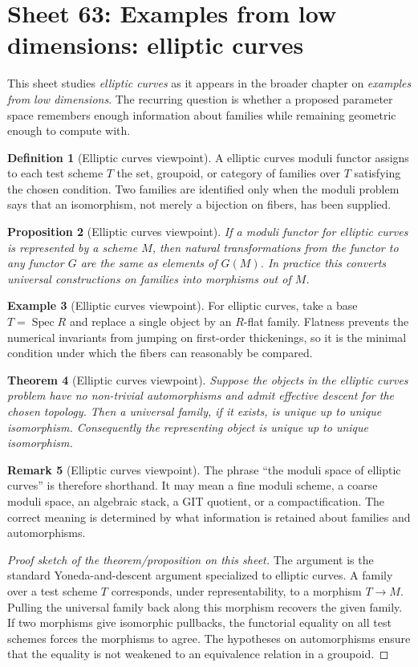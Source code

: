 \documentclass[11pt]{amsart}
\newtheorem{theorem}{Theorem}[section]
\newtheorem{proposition}[theorem]{Proposition}
\theoremstyle{definition}
\newtheorem{definition}[theorem]{Definition}
\newtheorem{example}[theorem]{Example}
\newtheorem{remark}[theorem]{Remark}
\newcommand{\Spec}{\operatorname{Spec}}
\begin{document}
\section{Sheet 63: Examples from low dimensions: elliptic curves}
This sheet studies \emph{elliptic curves} as it appears in the broader chapter on \emph{examples from low dimensions}.  The recurring question is whether a proposed parameter space remembers enough information about families while remaining geometric enough to compute with.
\begin{definition}[Elliptic curves viewpoint]
A elliptic curves moduli functor assigns to each test scheme $T$ the set, groupoid, or category of families over $T$ satisfying the chosen condition.  Two families are identified only when the moduli problem says that an isomorphism, not merely a bijection on fibers, has been supplied.
\end{definition}
\begin{proposition}[Elliptic curves viewpoint]
If a moduli functor for elliptic curves is represented by a scheme $M$, then natural transformations from the functor to any functor $G$ are the same as elements of $G(M)$.  In practice this converts universal constructions on families into morphisms out of $M$.
\end{proposition}
\begin{example}[Elliptic curves viewpoint]
For elliptic curves, take a base $T=\Spec R$ and replace a single object by an $R$-flat family.  Flatness prevents the numerical invariants from jumping on first-order thickenings, so it is the minimal condition under which the fibers can reasonably be compared.
\end{example}
\begin{theorem}[Elliptic curves viewpoint]
Suppose the objects in the elliptic curves problem have no non-trivial automorphisms and admit effective descent for the chosen topology.  Then a universal family, if it exists, is unique up to unique isomorphism.  Consequently the representing object is unique up to unique isomorphism.
\end{theorem}
\begin{remark}[Elliptic curves viewpoint]
The phrase ``the moduli space of elliptic curves'' is therefore shorthand.  It may mean a fine moduli scheme, a coarse moduli space, an algebraic stack, a GIT quotient, or a compactification.  The correct meaning is determined by what information is retained about families and automorphisms.
\end{remark}
\begin{proof}[Proof sketch of the theorem/proposition on this sheet]
The argument is the standard Yoneda-and-descent argument specialized to elliptic curves.  A family over a test scheme $T$ corresponds, under representability, to a morphism $T\to M$.  Pulling the universal family back along this morphism recovers the given family.  If two morphisms give isomorphic pullbacks, the functorial equality on all test schemes forces the morphisms to agree.  The hypotheses on automorphisms ensure that the equality is not weakened to an equivalence relation in a groupoid.
\end{proof}
\end{document}
